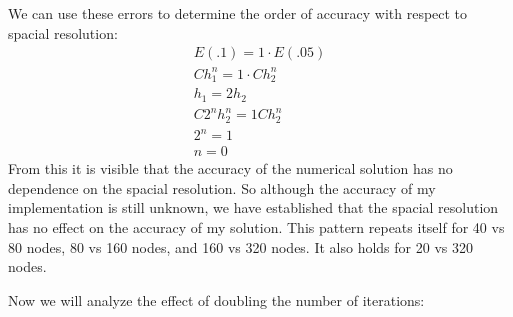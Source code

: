 \documentclass[12pt]{article}
\begin{document}
We can use these errors to determine the order of accuracy with respect to spacial resolution:
\begin{equation}
\begin{aligned}
  E(.1) = 1 \cdot E(.05) \\
  Ch_1^n = 1 \cdot C h_2^n \\
  h_1 = 2h_2 \\
  C2^nh_2^n = 1Ch_2^n \\
  2^n = 1 \\
  n = 0
\end{aligned}
\end{equation}
From this it is visible that the accuracy of the numerical solution has no dependence on the spacial resolution. So although the accuracy of my implementation is still unknown, we have established that the spacial resolution has no effect on the accuracy of my solution. This pattern repeats itself for 40 vs 80 nodes, 80 vs 160 nodes, and 160 vs 320 nodes. It also holds for 20 vs 320 nodes. 

Now we will analyze the effect of doubling the number of iterations:
\end{document}
